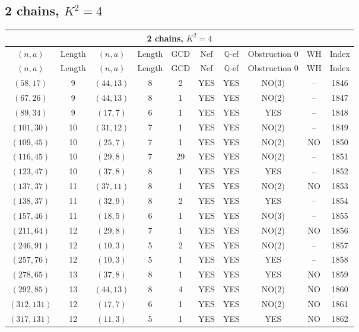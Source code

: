 \subsection{2 chains, $K^2 = 4$}
\begin{longtable}{|c|c|c|c|c|c|c|c|c|c|}
\hline
\multicolumn{10}{|c|}{2 chains, $K^2 = 4$}\\
\hline
$(n,a)$ & Length & $(n,a)$ & Length & GCD & Nef & $\mathbb Q$-ef & Obstruction 0 & WH & Index\\
\hline
\endfirsthead

\hline
$(n,a)$ & Length & $(n,a)$ & Length & GCD & Nef & $\mathbb Q$-ef & Obstruction 0 & WH & Index\\
\hline
\endhead
\hline
\endfoot

$(58, 17)$ & 9 & $(44, 13)$ & 8 & 2 & YES & YES & NO(3) & -- & 1846\\
$(67, 26)$ & 9 & $(44, 13)$ & 8 & 1 & YES & YES & NO(2) & -- & 1847\\
$(89, 34)$ & 9 & $(17, 7)$ & 6 & 1 & YES & YES & YES & -- & 1848\\
$(101, 30)$ & 10 & $(31, 12)$ & 7 & 1 & YES & YES & NO(2) & -- & 1849\\
$(109, 45)$ & 10 & $(25, 7)$ & 7 & 1 & YES & YES & NO(2) & NO & 1850\\
$(116, 45)$ & 10 & $(29, 8)$ & 7 & 29 & YES & YES & NO(2) & -- & 1851\\
$(123, 47)$ & 10 & $(37, 8)$ & 8 & 1 & YES & YES & YES & -- & 1852\\
$(137, 37)$ & 11 & $(37, 11)$ & 8 & 1 & YES & YES & NO(2) & NO & 1853\\
$(138, 37)$ & 11 & $(32, 9)$ & 8 & 2 & YES & YES & YES & -- & 1854\\
$(157, 46)$ & 11 & $(18, 5)$ & 6 & 1 & YES & YES & NO(3) & -- & 1855\\
$(211, 64)$ & 12 & $(29, 8)$ & 7 & 1 & YES & YES & NO(2) & NO & 1856\\
$(246, 91)$ & 12 & $(10, 3)$ & 5 & 2 & YES & YES & NO(2) & -- & 1857\\
$(257, 76)$ & 12 & $(10, 3)$ & 5 & 1 & YES & YES & YES & -- & 1858\\
$(278, 65)$ & 13 & $(37, 8)$ & 8 & 1 & YES & YES & YES & NO & 1859\\
$(292, 85)$ & 13 & $(44, 13)$ & 8 & 4 & YES & YES & NO(2) & NO & 1860\\
$(312, 131)$ & 12 & $(17, 7)$ & 6 & 1 & YES & YES & NO(2) & NO & 1861\\
$(317, 131)$ & 12 & $(11, 3)$ & 5 & 1 & YES & YES & YES & NO & 1862\\

\end{longtable}
